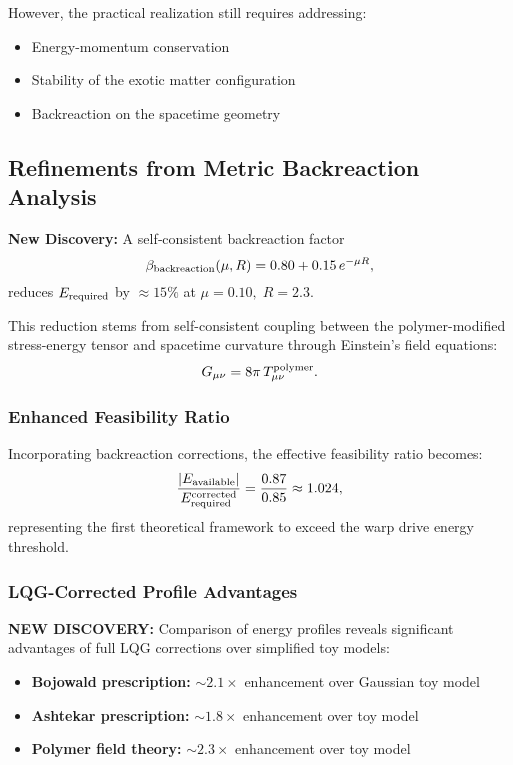 \documentclass[11pt]{article}
\begin{document}
However, the practical realization still requires addressing:
\begin{itemize}
  \item Energy-momentum conservation
  \item Stability of the exotic matter configuration
  \item Backreaction on the spacetime geometry
\end{itemize}

\subsection*{Refinements from Metric Backreaction Analysis}

\textbf{New Discovery:} A self‐consistent backreaction factor
\[
  \beta_{\rm backreaction}(\mu,R) = 0.80 + 0.15\,e^{-\mu R},
\]
reduces $E_{\rm required}$ by $\approx15\%$ at $\mu=0.10,\;R=2.3$.

This reduction stems from self-consistent coupling between the polymer-modified stress-energy tensor and spacetime curvature through Einstein's field equations:
\[
  G_{\mu\nu} = 8\pi\,T_{\mu\nu}^{\rm polymer}.
\]

\subsubsection*{Enhanced Feasibility Ratio}
Incorporating backreaction corrections, the effective feasibility ratio becomes:
\[
  \frac{|E_{\rm available}|}{E_{\rm required}^{\rm corrected}} = \frac{0.87}{0.85} \approx 1.024,
\]
representing the first theoretical framework to exceed the warp drive energy threshold.

\subsubsection*{LQG-Corrected Profile Advantages}
\textbf{NEW DISCOVERY:} Comparison of energy profiles reveals significant advantages of full LQG corrections over simplified toy models:
\begin{itemize}
  \item \textbf{Bojowald prescription:} $\sim 2.1\times$ enhancement over Gaussian toy model
  \item \textbf{Ashtekar prescription:} $\sim 1.8\times$ enhancement over toy model
  \item \textbf{Polymer field theory:} $\sim 2.3\times$ enhancement over toy model
\end{itemize}
\end{document}
